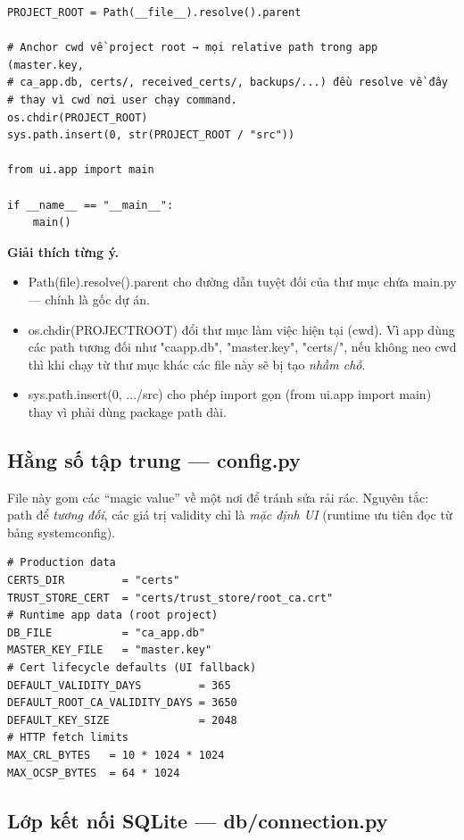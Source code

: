 \documentclass[12pt,a4paper]{article}
\newcommand{\code}[1]{{\ttfamily\small\def\_{\textunderscore\discretionary{}{}{}}#1}}
\begin{document}
\begin{Verbatim}
PROJECT_ROOT = Path(__file__).resolve().parent

# Anchor cwd về project root → mọi relative path trong app (master.key,
# ca_app.db, certs/, received_certs/, backups/...) đều resolve về đây
# thay vì cwd nơi user chạy command.
os.chdir(PROJECT_ROOT)
sys.path.insert(0, str(PROJECT_ROOT / "src"))

from ui.app import main

if __name__ == "__main__":
    main()
\end{Verbatim}

\textbf{Giải thích từng ý.}
\begin{itemize}
  \item \code{Path(\_\_file\_\_).resolve().parent} cho đường dẫn tuyệt đối của thư
        mục chứa \code{main.py} — chính là gốc dự án.
  \item \code{os.chdir(PROJECT\_ROOT)} đổi thư mục làm việc hiện tại (cwd). Vì app
        dùng các path tương đối như \code{"ca\_app.db"}, \code{"master.key"},
        \code{"certs/"}, nếu không neo cwd thì khi chạy từ thư mục khác các file
        này sẽ bị tạo \emph{nhầm chỗ}.
  \item \code{sys.path.insert(0, .../src)} cho phép import gọn (\code{from ui.app
        import main}) thay vì phải dùng package path dài.
\end{itemize}

\subsection{Hằng số tập trung — \code{config.py}}

File này gom các ``magic value'' về một nơi để tránh sửa rải rác. Nguyên tắc:
path để \emph{tương đối}, các giá trị validity chỉ là \emph{mặc định UI} (runtime
ưu tiên đọc từ bảng \code{system\_config}).

\begin{Verbatim}
# Production data
CERTS_DIR         = "certs"
TRUST_STORE_CERT  = "certs/trust_store/root_ca.crt"
# Runtime app data (root project)
DB_FILE           = "ca_app.db"
MASTER_KEY_FILE   = "master.key"
# Cert lifecycle defaults (UI fallback)
DEFAULT_VALIDITY_DAYS         = 365
DEFAULT_ROOT_CA_VALIDITY_DAYS = 3650
DEFAULT_KEY_SIZE              = 2048
# HTTP fetch limits
MAX_CRL_BYTES   = 10 * 1024 * 1024
MAX_OCSP_BYTES  = 64 * 1024
\end{Verbatim}

\subsection{Lớp kết nối SQLite — \code{db/connection.py}}
\end{document}
